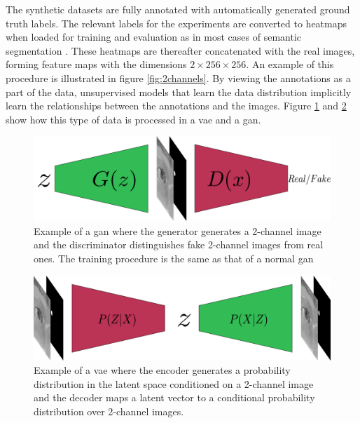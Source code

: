 The synthetic datasets are fully annotated with automatically generated ground truth labels. The relevant labels for the experiments are converted to heatmaps when loaded for training and evaluation as in most cases of semantic segmentation \parencite{guo2017review}. These heatmaps are thereafter concatenated with the real images, forming feature maps with the dimensions $2\times256\times256$. An example of this procedure is illustrated in figure \ref{fig:2channels}. By viewing the annotations as a part of the data, unsupervised models that learn the data distribution implicitly learn the relationships between the annotations and the images. Figure \ref{fig:2channelsGAN} and \ref{fig:2channelsVAE} show how this type of data is processed in a \acrshort{vae} and a \acrshort{gan}.

\begin{figure}[t]
    \centering
    \includegraphics[width=\textwidth]{images/misc/GAN_illustration_for_methods.pdf}
    \caption{Example of a \acrshort{gan} where the generator generates a 2-channel image and the discriminator distinguishes fake 2-channel images from real ones. The training procedure is the same as that of a normal \acrshort{gan}}
    \label{fig:2channelsGAN}
\end{figure}

\begin{figure}[t]
    \centering
    \includegraphics[width=\textwidth]{images/misc/VAE_illustration_for_methods.pdf}
    \caption{Example of a \acrshort{vae} where the encoder generates a probability distribution in the latent space conditioned on a 2-channel image and the decoder maps a latent vector to a conditional probability distribution over 2-channel images.}
    \label{fig:2channelsVAE}
\end{figure}



